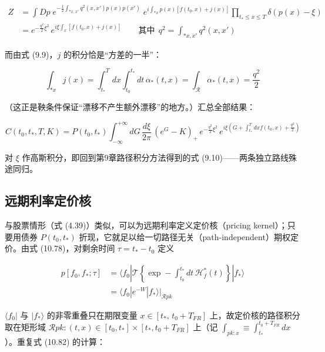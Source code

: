 \begin{equation*}
\begin{aligned}
Z&=\int Dp\;e^{-\frac{1}{2}\int_{*x,x'}q^2(x,x')p(x)p(x')}\;e^{i\int_{*x}p(x)[f(t_0,x)+j(x)]}\prod_{t_*\le x\le T}\delta(p(x)-\xi)\\
&=e^{-\frac{q^2}{2}\xi^2}\,e^{i\xi\int_x[f(t_0,x)+j(x)]}
\qquad\text{其中}\ \ q^2=\int_{*x,x'}q^2(x,x')
\end{aligned}
\end{equation*}

而由式 (9.9)，$j$ 的积分恰是“方差的一半”：

\begin{equation*}
\int_{*x}j(x)=\int_{t_*}^T dx\int_{t_0}^{t_*}dt\,\alpha_*(t,x)=\int_{\mathcal{R}}\alpha_*(t,x)=\frac{q^2}{2}
\end{equation*}

（这正是鞅条件保证“漂移不产生额外漂移”的地方。）汇总全部结果：

\begin{equation*}
C(t_0,t_*,T,K)=P(t_0,t_*)\int_{-\infty}^{+\infty}dG\,\frac{d\xi}{2\pi}\,(e^G-K)_+\,e^{-\frac{q^2}{2}\xi^2}\,e^{i\xi\left(G+\int_{t_*}^T dxf(t_0,x)+\frac{q^2}{2}\right)}
\end{equation*}

对 $\xi$ 作高斯积分，即回到第9章路径积分方法得到的式 (9.10)——两条独立路线殊途同归。

\subsection{远期利率定价核}

与股票情形（式 (4.39)）类似，可以为远期利率定义定价核（pricing kernel）；只要用债券 $P(t_0,t_*)$ 折现，它就足以给一切路径无关（path-independent）期权定价。由式 (10.78)，对剩余时间 $\tau=t_*-t_0$ 定义

\begin{equation*}
\begin{aligned}
p[f_0,f_*;\tau]&=\langle f_0|\mathcal{T}\left\{\exp-\int_{t_0}^{t_*}dt\,\mathcal{H}_f^*(t)\right\}|f_*\rangle\\
&=\langle f_0|e^{-W}|f_*\rangle\Big|_{\mathcal{R}pk}
\end{aligned}
\end{equation*}

$\langle f_0|$ 与 $|f_*\rangle$ 的非零重叠只在期限变量 $x\in[t_*,\,t_0+T_{FR}]$ 上，故定价核的路径积分取在矩形域 $\mathcal{R}pk:(t,x)\in[t_0,t_*]\times[t_*,t_0+T_{FR}]$ 上（记 $\int_{pk:x}\equiv\int_{t_*}^{t_0+T_{FR}}dx$）。重复式 (10.82) 的计算：

